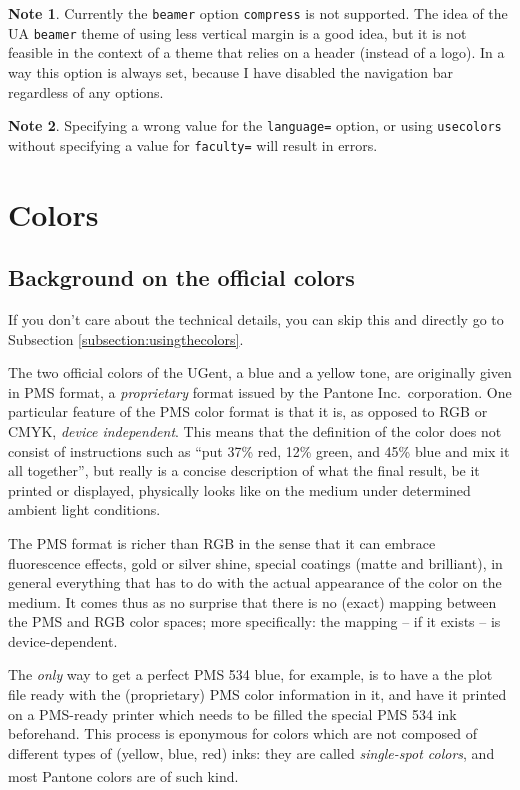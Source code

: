 \documentclass[a4paper,10pt]{article}
\theoremstyle{definition}
\newtheorem{note}{Note}
\begin{document}
\begin{note}
  Currently the \texttt{beamer} option \verb|compress| is not supported. The idea of the UA \texttt{beamer} theme of using less vertical margin is a good idea, but it is not feasible in the context of a theme that relies on a header (instead of a logo). In a way this option is always set, because I have disabled the navigation bar regardless of any options.
\end{note}

\begin{note}
  Specifying a wrong value for the \verb|language=| option, or using \verb|usecolors| without specifying a value for \verb|faculty=| will result in errors.
\end{note}


\section{Colors}
\label{section:colors}

\subsection{Background on the official colors}
If you don't care about the technical details, you can skip this and directly go to Subsection \ref{subsection:usingthecolors}.

The two official colors of the UGent, a blue and a yellow tone, are originally given in PMS format, a \emph{proprietary} format issued by the Pantone Inc.\ corporation. One particular feature of the PMS color format is that it is, as opposed to RGB or CMYK, \emph{device independent}. This means that the definition of the color does not consist of instructions such as \enquote{put 37\% red, 12\% green, and 45\% blue and mix it all together}, but really is a concise description of what the final result, be it printed or displayed, physically looks like on the medium under determined ambient light conditions.

The PMS format is richer than RGB in the sense that it can embrace fluorescence effects, gold or silver shine, special coatings (matte and brilliant), in general everything that has to do with the actual appearance of the color on the medium. It comes thus as no surprise that there is no (exact) mapping between the PMS and RGB color spaces; more specifically: the mapping -- if it exists -- is device-dependent.

The \emph{only} way to get a perfect PMS 534 blue, for example, is to have a the plot file ready with the (proprietary) PMS color information in it, and have it printed on a PMS-ready printer which needs to be filled the special PMS 534 ink beforehand. This process is eponymous for colors which are not composed of different types of (yellow, blue, red) inks: they are called \emph{single-spot colors}, and most Pantone\textsuperscript{\textregistered} colors are of such kind.
\end{document}

